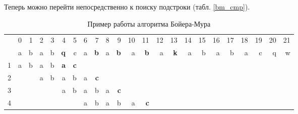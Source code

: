 \documentclass[a4paper,12pt]{article}
\begin{document}
Теперь можно перейти непосредственно к поиску подстроки (табл. \ref{bm_cmp}).

\begin{table} [h!]
\begin{center}
\caption{Пример работы алгоритма Бойера-Мура}
\begin{tabular}{|rrrrrrrrrrrrrrrrrrrrrrr|}
\hline
           &          0 &          1 &          2 &          3 &          4 &          5 &          6 &          7 &          8 &          9 &         10 &         11 &         12 &         13 &         14 &         15 &         16 &         17 &         18 &         19 &         20 &         21 \\

           &          a &          b &          a &          b &    {\bf q} &          c &          a &    {\bf b} &          a &    {\bf b} &          a &    {\bf b} &          a &    {\bf k} &          a &          b &          a &          b &          a &          c &          q &          w \\

         1 &          a &          b &          a &          b &    {\bf a} &    {\bf c} &            &            &            &            &            &            &            &            &            &            &            &            &            &            &            &            \\

         2 &            &            &          a &          b &          a &          b &          a &    {\bf c} &            &            &            &            &            &            &            &            &            &            &            &            &            &            \\

         3 &            &            &            &            &          a &          b &          a &          b &          a &    {\bf c} &            &            &            &            &            &            &            &            &            &            &            &            \\

         4 &            &            &            &            &            &            &          a &          b &          a &          b &          a &    {\bf c} &            &            &            &            &            &            &            &            &            &            \\


\end{tabular}
\end{center}
\end{table}
\end{document}

